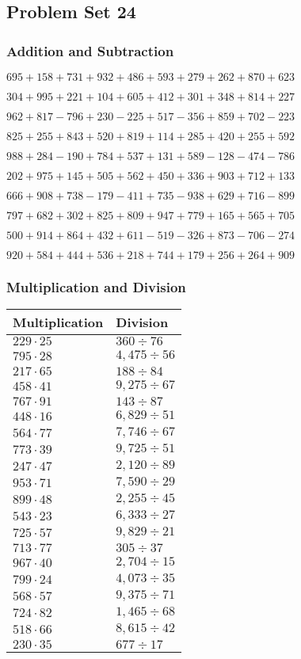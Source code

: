 \hypertarget{problem-set-24-2}{%
\subsection{Problem Set 24}\label{problem-set-24-2}}

\hypertarget{addition-and-subtraction-124}{%
\subsubsection{Addition and
Subtraction}\label{addition-and-subtraction-124}}

\(695 + 158 + 731 + 932 + 486 + 593 + 279 + 262 + 870 + 623\)

\(304 + 995 + 221 + 104 + 605 + 412 + 301 + 348 + 814 + 227\)

\(962 + 817 - 796 + 230 - 225 + 517 - 356 + 859 + 702 - 223\)

\(825 + 255 + 843 + 520 + 819 + 114 + 285 + 420 + 255 + 592\)

\(988 + 284 - 190 + 784 + 537 + 131 + 589 - 128 - 474 - 786\)

\(202 + 975 + 145 + 505 + 562 + 450 + 336 + 903 + 712 + 133\)

\(666 + 908 + 738 - 179 - 411 + 735 - 938 + 629 + 716 - 899\)

\(797 + 682 + 302 + 825 + 809 + 947 + 779 + 165 + 565 + 705\)

\(500 + 914 + 864 + 432 + 611 - 519 - 326 + 873 - 706 - 274\)

\(920 + 584 + 444 + 536 + 218 + 744 + 179 + 256 + 264 + 909\)

\hypertarget{multiplication-and-division-124}{%
\subsubsection{Multiplication and
Division}\label{multiplication-and-division-124}}

\begin{longtable}[]{@{}ll@{}}
\toprule
Multiplication & Division\tabularnewline
\midrule
\endhead
\(229 \cdot 25\) & \(360÷76\)\tabularnewline
\(795 \cdot 28\) & \(4,475÷56\)\tabularnewline
\(217 \cdot 65\) & \(188÷84\)\tabularnewline
\(458 \cdot 41\) & \(9,275÷67\)\tabularnewline
\(767 \cdot 91\) & \(143 ÷ 87\)\tabularnewline
\(448 \cdot 16\) & \(6,829÷51\)\tabularnewline
\(564 \cdot 77\) & \(7,746÷67\)\tabularnewline
\(773 \cdot 39\) & \(9,725÷51\)\tabularnewline
\(247 \cdot 47\) & \(2,120÷89\)\tabularnewline
\(953 \cdot 71\) & \(7,590÷29\)\tabularnewline
\(899 \cdot 48\) & \(2,255÷45\)\tabularnewline
\(543 \cdot 23\) & \(6,333÷27\)\tabularnewline
\(725 \cdot 57\) & \(9,829÷21\)\tabularnewline
\(713 \cdot 77\) & \(305÷37\)\tabularnewline
\(967 \cdot 40\) & \(2,704÷15\)\tabularnewline
\(799 \cdot 24\) & \(4,073÷35\)\tabularnewline
\(568 \cdot 57\) & \(9,375÷71\)\tabularnewline
\(724 \cdot 82\) & \(1,465÷68\)\tabularnewline
\(518 \cdot 66\) & \(8,615÷42\)\tabularnewline
\(230 \cdot 35\) & \(677÷17\)\tabularnewline
\bottomrule
\end{longtable}

